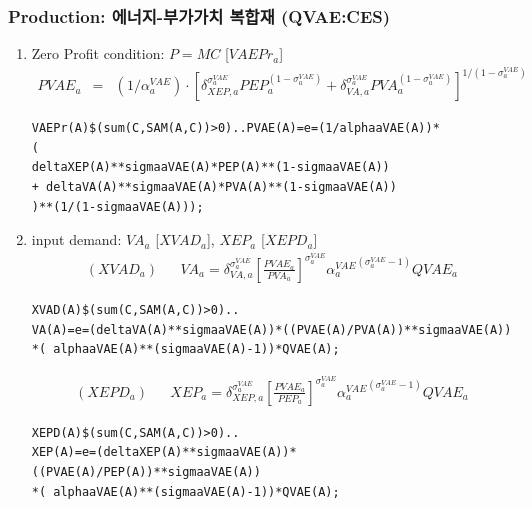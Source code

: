 \documentclass[10pt,compress,slidetop,%
			   hyperref={unicode},xcolor={svgnames},%
			   t]{beamer}
\begin{document}
\begin{frame}[fragile]
\frametitle{Production: 에너지-부가가치 복합재 (QVAE:CES)}
\begin{scriptsize}
\begin{enumerate}
\item{Zero Profit condition: $P=MC$ [$VAEPr_a$]}
\begin{eqnarray*}
PVAE_a&=&(1/\alpha^{VAE}_a)\cdot[\delta_{XEP,a}^{\sigma^{VAE}_a} PEP_a^{(1-\sigma^{VAE}_a)}+\delta_{VA,a}^{\sigma^{VAE}_a} PVA_a^{(1-\sigma^{VAE}_a)}]^{1/(1-\sigma^{VAE}_a)}
\end{eqnarray*}

\begin{verbatim}
VAEPr(A)$(sum(C,SAM(A,C))>0)..PVAE(A)=e=(1/alphaaVAE(A))*
(
deltaXEP(A)**sigmaaVAE(A)*PEP(A)**(1-sigmaaVAE(A))
+ deltaVA(A)**sigmaaVAE(A)*PVA(A)**(1-sigmaaVAE(A))
)**(1/(1-sigmaaVAE(A)));
\end{verbatim}
\item{input demand: $VA_a$ [$XVAD_a$], $XEP_a$ [$XEPD_a$]}
\begin{eqnarray*}
(XVAD_a)& &VA_a=\delta_{VA,a}^{\sigma^{VAE}_a}\left[\frac{PVAE_a}{PVA_a}\right]^{\sigma^{VAE}_a}{\alpha^{VAE}_a}^{({\sigma^{VAE}_a}-1)}QVAE_a
\end{eqnarray*}

\begin{verbatim} 
XVAD(A)$(sum(C,SAM(A,C))>0)..
VA(A)=e=(deltaVA(A)**sigmaaVAE(A))*((PVAE(A)/PVA(A))**sigmaaVAE(A))
*( alphaaVAE(A)**(sigmaaVAE(A)-1))*QVAE(A);
\end{verbatim}
\begin{eqnarray*}
(XEPD_a)& &XEP_a=\delta_{XEP,a}^{\sigma^{VAE}_a}\left[\frac{PVAE_a}{PEP_a}\right]^{\sigma^{VAE}_a}{\alpha^{VAE}_a}^{({\sigma^{VAE}_a}-1)}QVAE_a
\end{eqnarray*}

\begin{verbatim} 
XEPD(A)$(sum(C,SAM(A,C))>0)..
XEP(A)=e=(deltaXEP(A)**sigmaaVAE(A))*((PVAE(A)/PEP(A))**sigmaaVAE(A))
*( alphaaVAE(A)**(sigmaaVAE(A)-1))*QVAE(A);
\end{verbatim}
   
\end{enumerate}
\end{scriptsize}
\end{frame}
\end{document}
